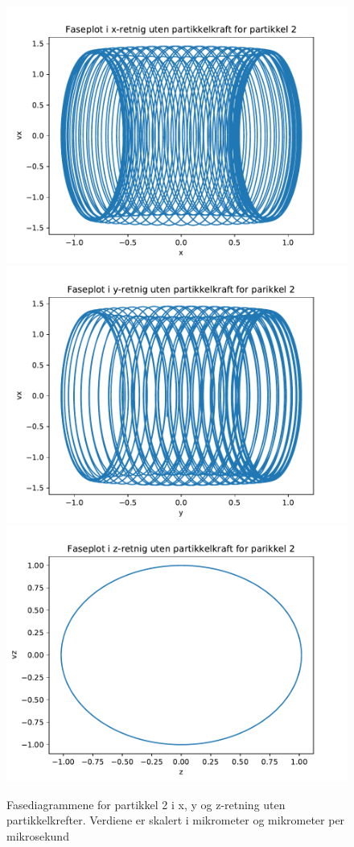 \documentclass[reprint,english,notitlepage, nofootinbib]{revtex4-1}  %
\begin{document}
\begin{figure}[H]
	\centering 
	\includegraphics[scale=0.4]{../pythonplots/xnoint2.pdf}
	\includegraphics[scale=0.4]{../pythonplots/ynoint2.pdf}
	\includegraphics[scale=0.4]{../pythonplots/znoint2.pdf}
	\caption{Fasediagrammene for partikkel 2 i x, y og z-retning uten partikkelkrefter. Verdiene er skalert i mikrometer og mikrometer per mikrosekund}
	\label{Fig:fasenoint2}
\end{figure}
\end{document}
